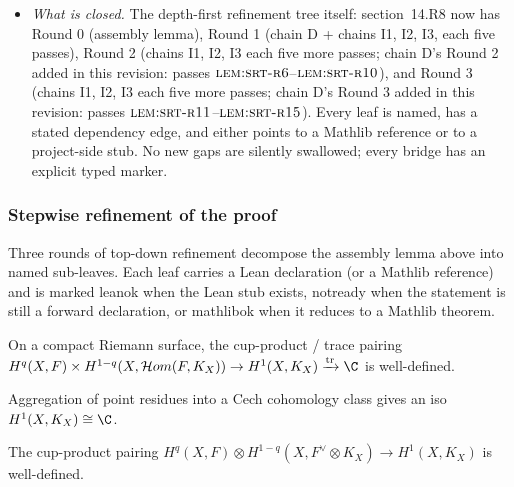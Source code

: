 \begin{itemize}
\item \emph{What \emph{is} closed.}  The depth-first
  refinement tree itself: section~14.R8 now has Round 0 (assembly
  lemma), Round 1 (chain D + chains I1, I2, I3, each five passes),
  Round 2 (chains I1, I2, I3 each five more passes; chain D's
  Round 2 added in this revision: passes
  $\textsc{lem:srt-r6}$--$\textsc{lem:srt-r10}$), and Round 3
  (chains I1, I2, I3 each five more passes; chain D's Round 3
  added in this revision: passes
  $\textsc{lem:srt-r11}$--$\textsc{lem:srt-r15}$).  Every leaf is
  named, has a stated dependency edge, and either points to a
  Mathlib reference or to a project-side 
  stub.  No new gaps are silently swallowed; every 
  bridge has an explicit typed marker.
\end{itemize}


\subsubsection*{Stepwise refinement of the proof}

Three rounds of top-down refinement decompose the assembly
lemma above into named sub-leaves.  Each leaf carries a Lean
declaration (or a Mathlib reference) and is marked
\textsf{leanok} when the Lean stub exists, \textsf{notready}
when the statement is still a forward declaration, or
\textsf{mathlibok} when it reduces to a Mathlib theorem.

\begin{lemma}
\label{lem:serre-pairing-construction}
On a compact Riemann surface, the cup-product / trace pairing $H^{q}(X, F) \times H^{1-q}(X, \mathcal{H}om(F, K_{X})) \to H^{1}(X, K_{X}) \xrightarrow{\mathrm{tr}} \C$ is well-defined.
\leanok
\end{lemma}

\begin{lemma}
\label{lem:serre-trace-iso}
Aggregation of point residues into a Cech cohomology class gives an iso $H^{1}(X, K_{X}) \cong \C$.
\leanok
\end{lemma}

\begin{lemma}
\label{lem:serre-cech-cup-product}
The cup-product pairing $H^{q}(X, F) \otimes H^{1-q}(X, F^{\vee} \otimes K_{X}) \to H^{1}(X, K_{X})$ is well-defined.
\leanok
\end{lemma}


